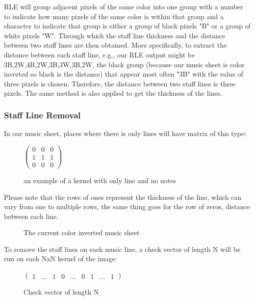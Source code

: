 \documentclass[a4paper,12pt]{report}
\begin{document}
RLE will group adjacent pixels of the same color into one group with a number to
indicate how many pixels of the same color is within that group and a character
to indicate that group is either a group of black pixels "B" or a group of white
pixels "W". Through which the staff line thickness and the distance between two
staff lines are then obtained. More specifically, to extract the distance between each
staff line, e.g., our RLE output might be 3B,2W,4B,2W,3B,3W,3B,2W, the black
group (because our music sheet is color inverted so black is the distance) that
appear most often "3B" with the value of three pixels is chosen. Therefore, the
distance between two staff lines is three pixels. The same method is also applied
to get the thickness of the lines.

\subsubsection{Staff Line Removal}
In our music sheet, places where there is only lines will have matrix of 
this type:

\begin{figure}[ht]
    \centering
    $
\begin{pmatrix}
	0 & 0 & 0\\
	1 & 1 & 1\\
	0 & 0 & 0
\end{pmatrix}
$\\
\caption{an example of a kernel with only line and no notes}
\label{line only matrix}
\end{figure}

\medskip

Please note that the rows of ones represent the thickness of the line, which can
vary from one to multiple rows, the same thing goes for the row of zeros, distance
between each line.

\begin{figure}[h]
    \caption{The current color inverted music sheet}
    \label{}
\end{figure}
 
To remove the staff lines on each music line, a check vector of length N will be run 
on each NxN kernel of the image:\\

\begin{figure}[ht]
    \centering
$
\begin{pmatrix}
	1 & ... & 1 & 0 & ... & 0 & 1 & ... & 1
\end{pmatrix}
$\\
\caption{Check vector of length N}
\label{check vector}
\end{figure}
\end{document}

